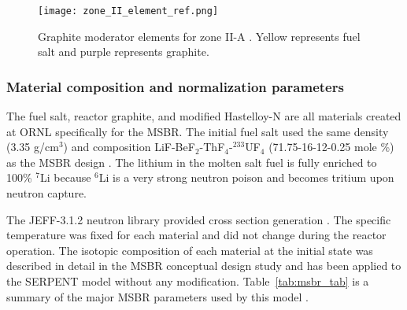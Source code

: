 \begin{figure}[ht!] %
  \texttt{[image: zone\_II\_element\_ref.png]}
  \caption{Graphite moderator elements for zone II-A 
  \cite{robertson_conceptual_1971,rykhlevskii_full-core_2017}.  Yellow 
  represents fuel salt and purple represents graphite.}
  \label{fig:II_element_ref}
\end{figure}

\subsubsection{Material composition and normalization parameters}
The fuel salt, reactor graphite, and modified Hastelloy-N
are all materials created at \gls{ORNL} specifically for the \gls{MSBR}.
The initial fuel salt used the same 
density (3.35 g/cm$^3$) and composition LiF-BeF$_2$-ThF$_4$-$^{233}$UF$_4$ 
(71.75-16-12-0.25 mole \%) as the \gls{MSBR} design 
\cite{robertson_conceptual_1971}. The lithium in the molten salt fuel is fully 
enriched to 100\% $^{7}$Li because $^{6}$Li is a very strong neutron poison and 
becomes tritium upon neutron capture. 

The JEFF-3.1.2 neutron library provided cross section generation 
\cite{oecd/nea_data_bank_jeff-3.1.2_2014}. 
The specific temperature was fixed for each material and did not change during 
the reactor operation. The isotopic 
composition of each material at the initial state was described in detail in 
the MSBR conceptual design study \cite{robertson_conceptual_1971} and has been 
applied to the SERPENT model without any modification. Table~\ref{tab:msbr_tab} is 
a summary of the major \gls{MSBR} parameters used by this model 
\cite{robertson_conceptual_1971}. 

